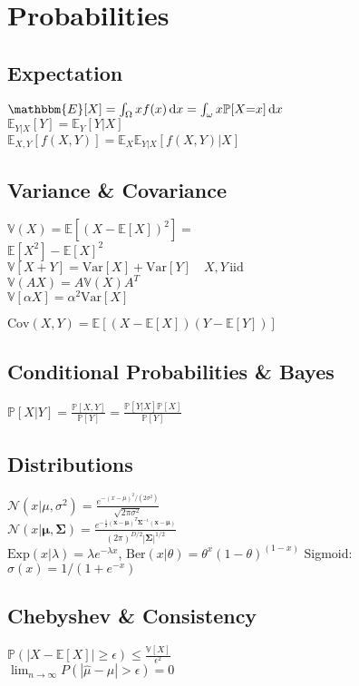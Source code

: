 \section*{Probabilities}
\subsection*{Expectation}
$\mathbbm{E}[X]=\int_{\Omega}xf(x)\di x=\int_{\omega}x\mathbb{P}[X{=}x]\di x$ \\
$\mathbb{E}_{Y|X}[Y]=\mathbb{E}_{Y}[Y|X]$\\
$\mathbb{E}_{X,Y}[f(X,Y)]=\mathbb{E}_{X}\mathbb{E}_{Y|X}[f(X,Y)|X]$

\subsection*{Variance \& Covariance}
$\mathbb{V}(X){=}\mathbb{E}[(X{-}\mathbb{E}[X])^2]{=}$ \\ $\mathbb{E}[X^2]{-}\mathbb{E}[X]^2$\\
$\mathbb{V}[X+Y]{=}\mathrm{Var}[X]+\mathrm{Var}[Y]\quad X,Y \,\text{iid}$\\
$\mathbb{V}(AX) = A \mathbb{V}(X) A^T$ \\
$\mathbb{V}[\alpha X]=\alpha^2\mathrm{Var}[X]$

$\mathrm{Cov}(X,Y)=\mathbb{E}[(X-\mathbb{E}[X])(Y-\mathbb{E}[Y])]$

\subsection*{Conditional Probabilities \& Bayes}
$\mathbb{P}[X|Y]=\frac{\mathbb{P}[X,Y]}{\mathbb{P}[Y]}=\frac{\mathbb{P}[Y|X]\mathbb{P}[X]}{\mathbb{P}[Y]}$

\subsection*{Distributions}
$\mathcal{N}(x|\mu, \sigma^2)=\frac{e^{-(x-\mu)^2/(2\sigma^2)}}{\sqrt{2\pi\sigma^2}}$\\
$\mathcal{N}(x|\bm{\mu}, \bm{\Sigma})= \frac{e^{-\frac{1}{2}(\mathbf{x}-\bm{\mu})^T\bm{\Sigma}^{-1}(\mathbf{x}-\bm{\mu})}}{(2\pi)^{D/2}|\bm{\Sigma}|^{1/2}} $\\
$\mathrm{Exp}(x|\lambda){=}\lambda e^{-\lambda x}$, $\mathrm{Ber}(x|\theta){=}\theta^x (1{-}\theta)^{(1-x)}$
Sigmoid: $\sigma(x)=1/(1+e^{-x})$


\subsection*{Chebyshev \& Consistency}
$\mathbb{P}(|X-\mathbb{E}[X]|\geq \epsilon)\leq \frac{\mathbb{V}[X]}{\epsilon^2}$\\
$\lim_{n\rightarrow\infty} P(|\hat{\mu}-\mu |>\epsilon)=0$

